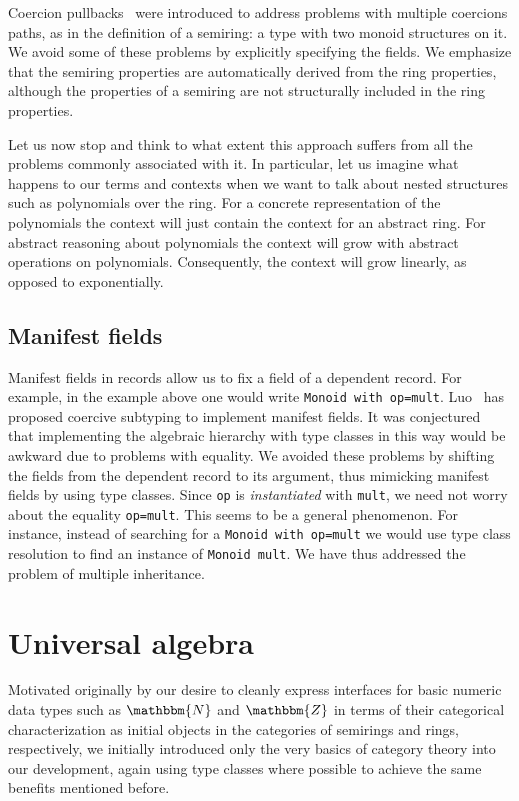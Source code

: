 \documentclass[a4paper,10pt,runningheads]{llncs}
\newcommand{\N}{\ensuremath{\mathbbm{N}}}
\newcommand{\Z}{\ensuremath{\mathbbm{Z}}}
\begin{document}
Coercion pullbacks~\cite{Hints} were introduced to address problems with multiple coercions paths,
as in the definition of a semiring: a type with two monoid structures on it. We avoid some
of these problems by explicitly specifying the fields. We emphasize that the semiring properties are
automatically derived from the ring properties, although the properties of a semiring are not
structurally included in the ring properties.

Let us now stop and think to what extent this approach suffers from all the problems commonly
associated with it. In particular, let us imagine what happens to our terms and contexts when we
want to talk about nested structures such as polynomials over the ring. For a concrete
representation of the polynomials the context will just contain the context for an abstract ring.
For abstract reasoning about polynomials the context will grow with abstract operations on
polynomials. Consequently, the context will grow linearly, as opposed to exponentially.

\subsection{Manifest fields}\label{manifest}

Manifest fields in records allow us to fix a field of a dependent record. For example, in the
example above one would write \lstinline|Monoid with op=mult|. 
Luo~\cite{DBLP:conf/types/Luo08} has proposed coercive subtyping to implement manifest fields.
It was conjectured~\cite{Hints} that implementing the algebraic hierarchy with type classes in this way would
be awkward due to problems with equality. We avoided these problems by shifting the fields
from the dependent record to its argument, thus mimicking manifest fields by using type classes.
Since \lstinline|op| is \emph{instantiated} with \lstinline|mult|, we need not worry about the
equality \lstinline|op=mult|. This seems to be a general phenomenon. For instance, instead of searching
for a \lstinline|Monoid with op=mult| we would use type class resolution to find an instance of \lstinline|Monoid mult|.
We have thus addressed the problem of multiple inheritance.

\section{Universal algebra}\label{univ}
Motivated originally by our desire to cleanly express interfaces for basic numeric data types such as $\N$ and $\Z$ in terms of their categorical characterization as initial objects in the categories of semirings and rings, respectively, we initially introduced only the very basics of category theory into our development, again using type classes where possible to achieve the same benefits mentioned before.
\end{document}
